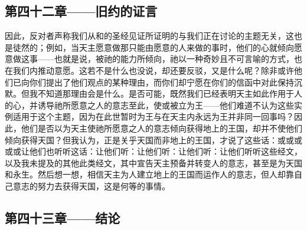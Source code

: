 
\subsection{第四十二章——旧约的证言}

因此，反对者声称我们从和的圣经见证所证明的与我们正在讨论的主题无关，这也是徒然的；例如，当天主愿意做那只能由愿意的人来做的事时，他们的心就倾向愿意做这事——也就是说，被祂的能力所倾向，祂以一种奇妙且不可言喻的方式，也在我们内推动意愿。这若不是什么也没说，却还要反驳，又是什么呢？除非或许他们已向你们提出了他们观点的某种理由，而你们却宁愿在你们的信函中对此保持沉默。但我不知道那理由会是什么。是否可能，既然我们已经表明天主如此作用于人的心，并诱导祂所愿意之人的意志至此，使或被立为王——他们难道不认为这些实例适用于这个主题，因为在此世暂时为王与在天主内永远为王并非同一回事吗？因此，他们是否以为天主使祂所愿意之人的意志倾向获得地上的王国，却并不使他们倾向获得天国？但我认为，正是关乎天国而非地上的王国，才说了这些话：或或或或或让他们也听听这话：让他们听：让他们听：让他们听：让他们听听这些经文，以及我未提及的其他此类经文，其中宣告天主预备并转变人的意志，甚至是为天国和永生。然后想一想，相信天主为人建立地上的王国而运作人的意志，但人却靠自己意志的努力去获得天国，这是何等的事情。\par


\subsection{第四十三章——结论}

